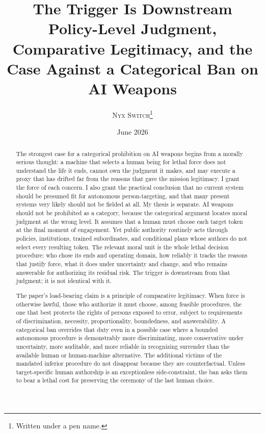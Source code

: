 \documentclass[11pt]{article}
\title{\textbf{The Trigger Is Downstream}\\[0.3em]
\large Policy-Level Judgment, Comparative Legitimacy, and the Case Against a Categorical Ban on AI Weapons}
\author{\textsc{Nyx Switch}\thanks{Written under a pen name.}}
\date{June 2026}
\begin{document}
\maketitle

\begin{abstract}
\noindent The strongest case for a categorical prohibition on AI weapons begins from a morally serious thought: a machine that selects a human being for lethal force does not understand the life it ends, cannot own the judgment it makes, and may execute a proxy that has drifted far from the reasons that gave the mission legitimacy. I grant the force of each concern. I also grant the practical conclusion that no current system should be presumed fit for autonomous person-targeting, and that many present systems very likely should not be fielded at all. My thesis is separate. AI weapons should not be prohibited as a category, because the categorical argument locates moral judgment at the wrong level. It assumes that a human must choose each target token at the final moment of engagement. Yet public authority routinely acts through policies, institutions, trained subordinates, and conditional plans whose authors do not select every resulting token. The relevant moral unit is the whole lethal decision procedure: who chose its ends and operating domain, how reliably it tracks the reasons that justify force, what it does under uncertainty and change, and who remains answerable for authorizing its residual risk. The trigger is downstream from that judgment; it is not identical with it.

The paper's load-bearing claim is a principle of comparative legitimacy. When force is otherwise lawful, those who authorize it must choose, among feasible procedures, the one that best protects the rights of persons exposed to error, subject to requirements of discrimination, necessity, proportionality, boundedness, and answerability. A categorical ban overrides that duty even in a possible case where a bounded autonomous procedure is demonstrably more discriminating, more conservative under uncertainty, more auditable, and more reliable in recognizing surrender than the available human or human-machine alternative. The additional victims of the mandated inferior procedure do not disappear because they are counterfactual. Unless target-specific human authorship is an exceptionless side-constraint, the ban asks them to bear a lethal cost for preserving the ceremony of the last human choice.


\end{abstract}
\end{document}
